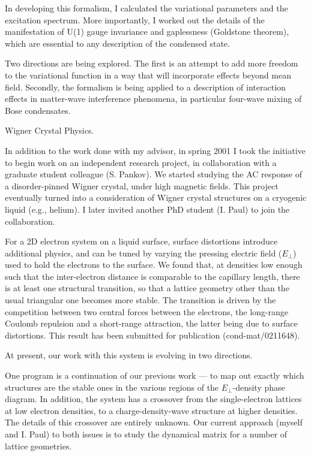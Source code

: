 \documentclass[11pt]{article}
\newcommand{\heading}{\Large}
\begin{document}
In developing this formalism, I calculated the variational parameters
and the excitation spectrum.  More importantly, I worked out the
details of the manifestation of U(1) gauge invariance and
gaplessness (Goldstone theorem), which are essential to any
description of the condensed state.

Two directions are being explored.  The first is an attempt to add
more freedom to the variational function in a way that will
incorporate effects beyond mean field.  Secondly, the formalism is
being applied to a description of interaction effects in matter-wave
interference phenomena, in particular four-wave mixing of Bose
condensates.


{\heading Wigner Crystal Physics}.

In addition to the work done with my advisor, in spring 2001 I took
the initiative to begin work on an independent research project, in
collaboration with a graduate student colleague (S. Pankov).  We
started studying the AC response of a disorder-pinned Wigner crystal,
under high magnetic fields.  This project eventually turned into a
consideration of Wigner crystal structures on a cryogenic liquid
(e.g., helium).  I later invited another PhD student (I. Paul) to join
the collaboration.


For a 2D electron system on a liquid surface, surface distortions
introduce additional physics, and can be tuned by varying the pressing
electric field ($E_\perp$) used to hold the electrons to the surface.
We found that, at densities low enough such that the inter-electron
distance is comparable to the capillary length, there is at least one
structural transition, so that a lattice geometry other than the usual
triangular one becomes more stable.  The transition is driven by the
competition between two central forces between the electrons, the
long-range Coulomb repulsion and a short-range attraction, the latter
being due to surface distortions.  This result has been submitted for
publication (cond-mat/0211648).

At present, our work with this system is evolving in two directions.

One program is a continuation of our previous work --- to map out
exactly which structures are the stable ones in the various regions of
the $E_\perp$-density phase diagram.  In addition, the system has a
crossover from the single-electron lattices at low electron densities,
to a charge-density-wave structure at higher densities.  The details
of this crossover are entirely unknown.  Our current approach (myself
and I. Paul) to both issues is to study the dynamical matrix for a
number of lattice geometries.
\end{document}
